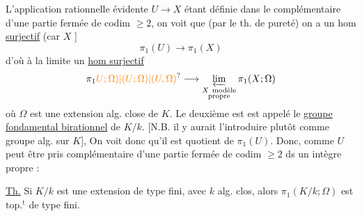 
L'application rationnelle évidente
$U\to X$ étant définie dans
le complémentaire d'une partie fermée de
codim $\geq 2$, on voit que (par le th. de
pureté) on a un hom \uline{surjectif} (car $X$ ]
\[
\pi_1(U)\to\pi_1(X)
\]
d'où à la limite un \uline{hom \uline{surjectif}}
\[
\pi_1\unsure{U;\Omega)|(U;\Omega)|(U,\Omega)}\longrightarrow
\varprojlim_{\substack{X\ \text{modèle}\\\text{propre}}}\pi_1(X;\Omega)
\]
où $\Omega$ est une extension alg. close de $K$.
Le deuxième est est appelé le \uline{groupe fondamental
birationnel} de $K/k$. [N.B. il y aurait
 l'introduire plutôt comme groupe alg.
sur $K$],  On voit donc qu'il est 
 quotient de $\pi_1(U)$. Donc, comme
$U$ peut être pris complémentaire d'une partie fermée
de codim $\geq 2$ ds un  intègre propre :

\uline{Th.} Si $K/k$ est une extension de
type fini, avec $k$ alg. clos, alors
 $\pi_1(K/k;\Omega)$ est top.$^{\mathrm t}$ de type fini.

